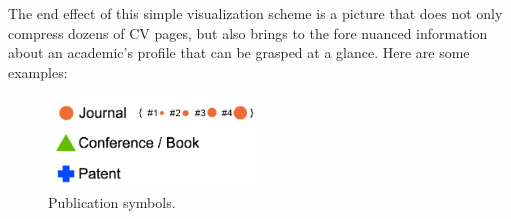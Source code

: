 The end effect of this simple visualization scheme is a picture that does not only compress dozens of CV pages, but also brings to the fore nuanced information about an academic's profile that can be grasped at a glance. Here are some examples:
\begin{figure}
    \centering
    \includegraphics[width=0.5\textwidth]{figures/fig-disksize}
    \caption{Publication symbols.}
    \label{fig:symbols} 
\end{figure}
